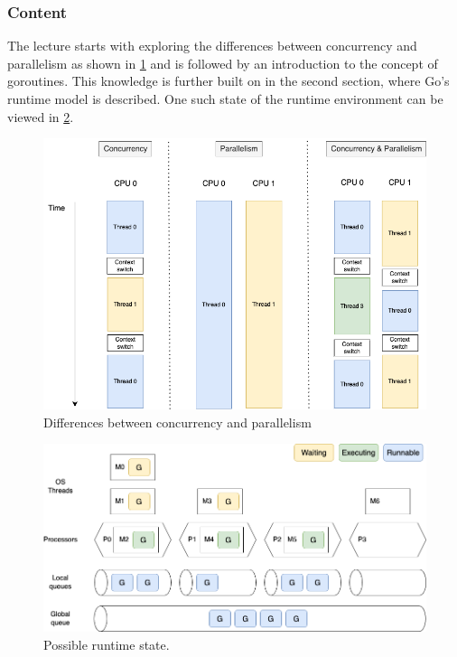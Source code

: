 \documentclass[
  digital,
  color,
  oneside,
  nosansbold,
  nocolorbold,
  nolof,
  nolot,
]{fithesis4}
\begin{document}
\subsubsection{Content}

The lecture starts with exploring the differences between concurrency and parallelism as shown in \cref{fig:con-vs-par} and is followed by an introduction to the concept of goroutines. This knowledge is further built on in the second section, where Go's runtime model is described. One such state of the runtime environment can be viewed in \cref{fig:runtime}.

\begin{figure}[H]
    \centering
    \includegraphics[width=12cm]{figures/concurrency-parallelism.png}
    \caption{Differences between concurrency and parallelism}
    \label{fig:con-vs-par}
\end{figure}

\begin{figure}[H]
    \centering
    \includegraphics[width=12cm]{figures/scheduling.png}
    \caption{Possible runtime state.}
    \label{fig:runtime}
\end{figure}
\end{document}
